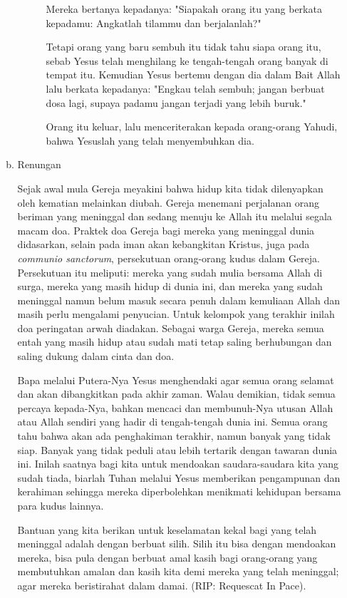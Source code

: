 \documentclass[a5paper,titlepage,12pt]{scrbook}
\begin{document}
\begin{itemize}
\begin{enumerate}[a.]
\begin{description}
Mereka bertanya kepadanya: "Siapakah orang itu yang berkata kepadamu: Angkatlah tilammu dan berjalanlah?"

Tetapi orang yang baru sembuh itu tidak tahu siapa orang itu, sebab Yesus telah menghilang ke tengah-tengah orang banyak di tempat itu. Kemudian Yesus bertemu dengan dia dalam Bait Allah lalu berkata kepadanya: "Engkau telah sembuh; jangan berbuat dosa lagi, supaya padamu jangan terjadi yang lebih buruk."

Orang itu keluar, lalu menceriterakan kepada orang-orang Yahudi, bahwa Yesuslah yang telah menyembuhkan dia.

 
			\end{description}

		\item Renungan


Sejak awal mula Gereja meyakini bahwa hidup kita tidak dilenyapkan oleh kematian melainkan diubah. Gereja menemani perjalanan orang beriman yang meninggal dan sedang menuju ke Allah itu melalui segala macam doa. Praktek doa Gereja bagi mereka yang meninggal dunia didasarkan, selain pada iman akan kebangkitan Kristus, juga pada \textit{communio sanctorum}, persekutuan orang-orang kudus dalam Gereja. Persekutuan itu meliputi: mereka yang sudah mulia bersama Allah di surga, mereka yang masih hidup di dunia ini, dan mereka yang sudah meninggal namun belum masuk secara penuh dalam kemuliaan Allah dan masih perlu mengalami penyucian. Untuk kelompok yang terakhir inilah doa peringatan arwah diadakan. Sebagai warga Gereja, mereka semua entah yang masih hidup atau sudah mati tetap saling berhubungan dan saling dukung dalam cinta dan doa.

Bapa melalui Putera-Nya Yesus menghendaki agar semua orang selamat dan akan dibangkitkan pada akhir zaman.
Walau demikian, tidak semua percaya kepada-Nya, bahkan mencaci dan membunuh-Nya utusan Allah atau Allah sendiri yang  hadir di tengah-tengah dunia ini. Semua orang tahu bahwa akan ada penghakiman terakhir, namun banyak yang tidak siap. Banyak yang tidak peduli atau lebih tertarik dengan tawaran dunia ini. Inilah saatnya bagi kita untuk mendoakan saudara-saudara kita yang sudah tiada, biarlah Tuhan melalui Yesus memberikan  pengampunan dan kerahiman sehingga mereka diperbolehkan  menikmati kehidupan bersama para kudus lainnya. 

Bantuan yang kita berikan untuk keselamatan kekal bagi yang telah meninggal adalah dengan berbuat silih. Silih itu bisa dengan mendoakan mereka, bisa pula dengan berbuat amal kasih bagi orang-orang yang membutuhkan amalan dan kasih kita demi mereka yang telah meninggal; agar mereka beristirahat dalam damai. (RIP: Requescat In Pace).


\end{enumerate}
\end{itemize}
\end{document}
